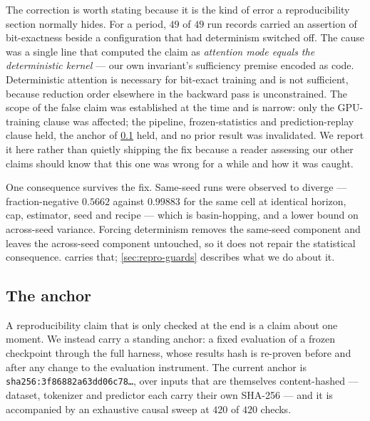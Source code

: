 The correction is worth stating because it is the kind of error a reproducibility section normally
hides. For a period, $49$ of $49$ run records carried an assertion of bit-exactness beside a
configuration that had determinism switched off. The cause was a single line that computed the
claim as \emph{attention mode equals the deterministic kernel} --- our own invariant's sufficiency
premise encoded as code. Deterministic attention is necessary for bit-exact training and is not
sufficient, because reduction order elsewhere in the backward pass is unconstrained. The scope of
the false claim was established at the time and is narrow: only the GPU-training clause was
affected; the pipeline, frozen-statistics and prediction-replay clause held, the anchor of
\cref{sec:repro-anchor} held, and no prior result was invalidated. We report it here rather than
quietly shipping the fix because a reader assessing our other claims should know that this one was
wrong for a while and how it was caught.

One consequence survives the fix. Same-seed runs were observed to diverge --- fraction-negative
$0.5662$ against $0.99883$ for the same cell at identical horizon, cap, estimator, seed and recipe
--- which is basin-hopping, and a lower bound on across-seed variance. Forcing determinism removes
the same-seed component and leaves the across-seed component untouched, so it does not repair the
statistical consequence.  carries that; \cref{sec:repro-guards} describes what
we do about it.

\subsection{The anchor}
\label{sec:repro-anchor}

A reproducibility claim that is only checked at the end is a claim about one moment. We instead
carry a standing anchor: a fixed evaluation of a frozen checkpoint through the full harness, whose
results hash is re-proven before and after any change to the evaluation instrument. The current
anchor is \texttt{sha256:3f86882a63dd06c78\ldots}, over inputs that are themselves content-hashed
--- dataset, tokenizer and predictor each carry their own SHA-256 --- and it is accompanied by an
exhaustive causal sweep at $420$ of $420$ checks.

